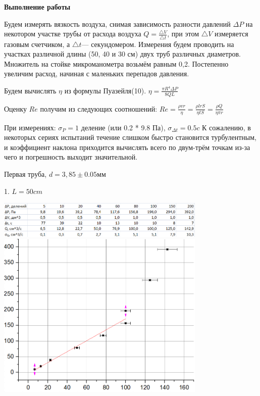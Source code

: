 \documentclass[12pt]{article}
\begin{document}
    \begin{center}
    	\textbf{\large{Выполнение работы}}
    \end{center}
    
    Будем измерять вязкость воздуха, снимая зависимость разности давлений $\Delta P$ на некотором участке трубы от расхода воздуха $Q = \frac{\bigtriangleup V}{\bigtriangleup t}$, при этом $\bigtriangleup V$ измеряется газовым счетчиком, а $\bigtriangleup t$— секундомером. Измерения будем проводить на участках различной длины (50, 40 и 30 см) двух труб различных диаметров. Множитель на стойке микроманометра возьмём равным 0,2. Постепенно увеличим расход, начиная с маленьких перепадов давления.
    
    Будем вычислять $\eta$ из формулы Пуазейля(10).
    $\eta = \frac {\pi R ^ 4 \Delta P}{8 QL}$
    
    Оценку $Re$ получим из следующих соотношений: $Re = \frac{\rho vr}{\eta} = \frac{\rho lrS}{\eta tS} = \frac{\rho Q}{\eta \pi r}$
    
    При измерениях: $ \sigma_P = 1 $ деление (или 0.2 * 9.8 Па), $\sigma_{\Delta t} = 0.5c$
    \newline
    К сожалению, в некоторых сериях испытаний течение слишком быстро становится турбулентным, и коэффициент наклона приходится вычислять всего по двум-трём точкам из-за чего и погрешность выходит значительной.
    \newline
    
    Первая труба, $d=3,85 \pm 0.05 мм$
    
    1. $L = 50 cm$
    
    \begin{center}
    	\includegraphics[width=10cm]{table1.png}
    	\includegraphics[width=10cm]{graph1.png}
    \end{center}
    
\end{document}
